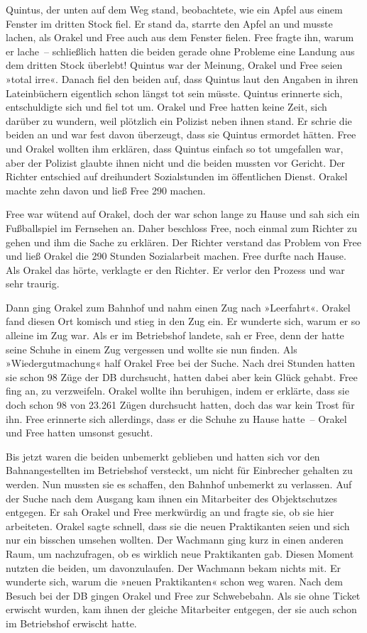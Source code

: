 Quintus, der unten auf dem Weg stand, beobachtete, wie ein Apfel aus einem Fenster im dritten Stock fiel. Er stand da, starrte den Apfel an und musste lachen, als Orakel und Free auch aus dem Fenster fielen. Free fragte ihn, warum er lache~– schließlich hatten die beiden gerade ohne Probleme eine Landung aus dem dritten Stock überlebt! Quintus war der Meinung, Orakel und Free seien »total irre«. Danach fiel den beiden auf, dass Quintus laut den Angaben in ihren Lateinbüchern eigentlich schon längst tot sein müsste. Quintus erinnerte sich, entschuldigte sich und fiel tot um. Orakel und Free hatten keine Zeit, sich darüber zu wundern, weil plötzlich ein Polizist neben ihnen stand. Er schrie die beiden an und war fest davon überzeugt, dass sie Quintus ermordet hätten. Free und Orakel wollten ihm erklären, dass Quintus einfach so tot umgefallen war, aber der Polizist glaubte ihnen nicht und die beiden mussten vor Gericht. Der Richter entschied auf dreihundert Sozialstunden im öffentlichen Dienst. Orakel machte zehn davon und ließ Free 290 machen.

Free war wütend auf Orakel, doch der war schon lange zu Hause und sah sich ein Fußballspiel im Fernsehen an. Daher beschloss Free, noch einmal zum Richter zu gehen und ihm die Sache zu erklären. Der Richter verstand das Problem von Free und ließ Orakel die 290 Stunden Sozialarbeit machen. Free durfte nach Hause. Als Orakel das hörte, verklagte er den Richter. Er verlor den Prozess und war sehr traurig.

Dann ging Orakel zum Bahnhof und nahm einen Zug nach »Leerfahrt«. Orakel fand diesen Ort komisch und stieg in den Zug ein. Er wunderte sich, warum er so alleine im Zug war. Als er im Betriebshof landete, sah er Free, denn der hatte seine Schuhe in einem Zug vergessen und wollte sie nun finden. Als »Wiedergutmachung« half Orakel Free bei der Suche. Nach drei Stunden hatten sie schon 98 Züge der DB durchsucht, hatten dabei aber kein Glück gehabt. Free fing an, zu verzweifeln. Orakel wollte ihn beruhigen, indem er erklärte, dass sie doch schon 98 von 23.261 Zügen durchsucht hatten, doch das war kein Trost für ihn. Free erinnerte sich allerdings, dass er die Schuhe zu Hause hatte~– Orakel und Free hatten umsonst gesucht.

Bis jetzt waren die beiden unbemerkt geblieben und hatten sich vor den Bahnangestellten im Betriebshof versteckt, um nicht für Einbrecher gehalten zu werden. Nun mussten sie es schaffen, den Bahnhof unbemerkt zu verlassen. Auf der Suche nach dem Ausgang kam ihnen ein Mitarbeiter des Objektschutzes entgegen. Er sah Orakel und Free merkwürdig an und fragte sie, ob sie hier arbeiteten. Orakel sagte schnell, dass sie die neuen Praktikanten seien und sich nur ein bisschen umsehen wollten. Der Wachmann ging kurz in einen anderen Raum, um nachzufragen, ob es wirklich neue Praktikanten gab. Diesen Moment nutzten die beiden, um davonzulaufen. Der Wachmann bekam nichts mit. Er wunderte sich, warum die »neuen Praktikanten« schon weg waren. Nach dem Besuch bei der DB gingen Orakel und Free zur Schwebebahn. Als sie ohne Ticket erwischt wurden, kam ihnen der gleiche Mitarbeiter entgegen, der sie auch schon im Betriebshof erwischt hatte.

